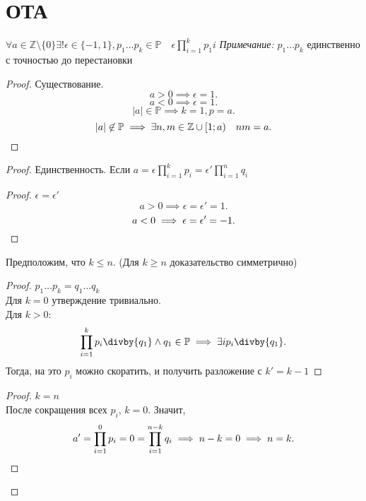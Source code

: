 \documentclass[11pt, oneside]{article}   	%
\begin{document}
\section{ОТА}
    \begin{theorem}
    $\forall{a \in \mathbb{Z}\setminus\{0\}\exists!\epsilon \in \{-1, 1\}, p_1 \ldots p_k \in \mathbb{P} \quad \epsilon\prod\limits_{i=1}^{k}p_1i}$
    \textit{Примечание:} $p_1 \ldots p_k$ единственно с точностью до перестановки\\
    \begin{proof} Существование.
        \[ a > 0 \implies \epsilon=1 .\]
        \[ a < 0 \implies \epsilon=1 .\]
        \[ |a| \in \mathbb{P} \implies k=1, p=a .\]
        \[ |a| \not\in \mathbb{P} \implies \exists{n,m \in \mathbb{Z}\cup \left[1; a\right)}\quad nm=a.\qedhere\]  
    \end{proof}
    \begin{proof} Единственность.
        Если $a=\epsilon\prod_{i=1}^{k}p_i=\epsilon'\prod\limits_{i=1}^{n}q_i$
        \begin{proof}
            $\epsilon = \epsilon'$
            \[ a > 0 \implies \epsilon = \epsilon' = 1 .\]
            \[ a < 0 \implies \epsilon = \epsilon' = -1 .\qedhere\] 
        \end{proof}
        Предположим, что $k \le n$. (Для $k \ge n$ доказательство симметрично)
        \begin{proof} $p_1\ldots p_k = q_1\ldots q_k$\\
            Для $k=0$ утверждение тривиально.\\
            Для $k>0$:
            \[ \prod\limits_{i=1}^{k}p_i\divby{q_1}\wedge{q_1 \in \mathbb{P}} \implies \exists{i} p_i\divby{q_1} .\]
            Тогда, на это $p_i$ можно скоратить, и получить разложение с $k'=k-1$\qedhere
        \end{proof}
        \begin{proof} $k=n$\\
            После сокращения всех $p_i$,  $k=0$. Значит,
            \[ a' = \prod\limits_{i=1}^0p_i = 0 = \prod\limits_{i=1}^{n-k}q_i \implies n-k=0 \implies n=k.\qedhere\]
        \end{proof}
        \let\qed\relax
    \end{proof}
    \end{theorem}
\end{document}
